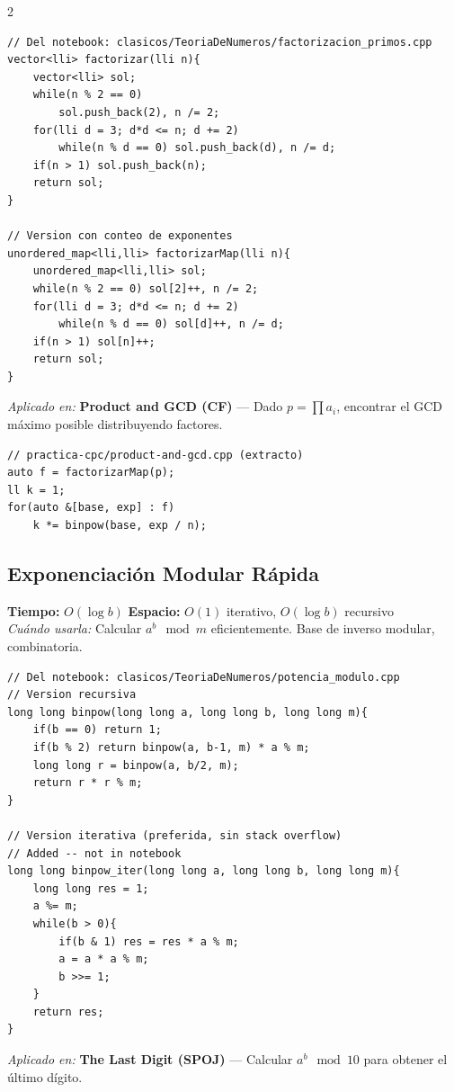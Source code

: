 \documentclass[10pt,a4paper]{article}
\begin{document}
\begin{multicols}{2}
\begin{lstlisting}
// Del notebook: clasicos/TeoriaDeNumeros/factorizacion_primos.cpp
vector<lli> factorizar(lli n){
    vector<lli> sol;
    while(n % 2 == 0)
        sol.push_back(2), n /= 2;
    for(lli d = 3; d*d <= n; d += 2)
        while(n % d == 0) sol.push_back(d), n /= d;
    if(n > 1) sol.push_back(n);
    return sol;
}

// Version con conteo de exponentes
unordered_map<lli,lli> factorizarMap(lli n){
    unordered_map<lli,lli> sol;
    while(n % 2 == 0) sol[2]++, n /= 2;
    for(lli d = 3; d*d <= n; d += 2)
        while(n % d == 0) sol[d]++, n /= d;
    if(n > 1) sol[n]++;
    return sol;
}
\end{lstlisting}

\textit{Aplicado en:} \textbf{Product and GCD (CF)} --- Dado $p = \prod a_i$, encontrar el GCD m\'aximo posible distribuyendo factores.

\begin{lstlisting}
// practica-cpc/product-and-gcd.cpp (extracto)
auto f = factorizarMap(p);
ll k = 1;
for(auto &[base, exp] : f)
    k *= binpow(base, exp / n);
\end{lstlisting}

\subsection{Exponenciaci\'on Modular R\'apida}
\textbf{Tiempo:} $O(\log b)$ \quad \textbf{Espacio:} $O(1)$ iterativo, $O(\log b)$ recursivo\\
\textit{Cu\'ando usarla:} Calcular $a^b \mod m$ eficientemente. Base de inverso modular, combinatoria.

\begin{lstlisting}
// Del notebook: clasicos/TeoriaDeNumeros/potencia_modulo.cpp
// Version recursiva
long long binpow(long long a, long long b, long long m){
    if(b == 0) return 1;
    if(b % 2) return binpow(a, b-1, m) * a % m;
    long long r = binpow(a, b/2, m);
    return r * r % m;
}

// Version iterativa (preferida, sin stack overflow)
// Added -- not in notebook
long long binpow_iter(long long a, long long b, long long m){
    long long res = 1;
    a %= m;
    while(b > 0){
        if(b & 1) res = res * a % m;
        a = a * a % m;
        b >>= 1;
    }
    return res;
}
\end{lstlisting}

\textit{Aplicado en:} \textbf{The Last Digit (SPOJ)} --- Calcular $a^b \mod 10$ para obtener el \'ultimo d\'igito.


\end{multicols}
\end{document}
